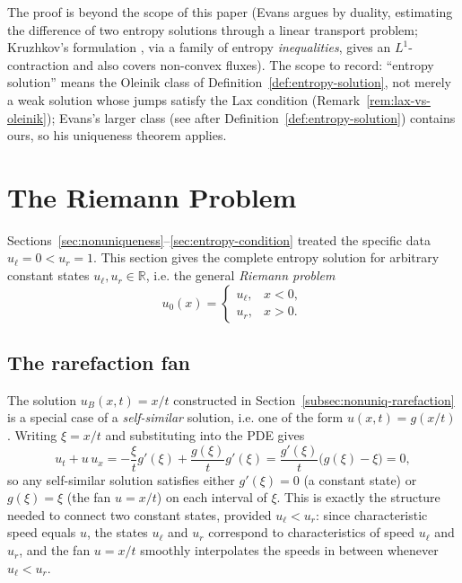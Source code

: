 \noindent The proof is beyond the scope of this paper (Evans argues by duality,
estimating the difference of two entropy solutions through a linear transport
problem; Kruzhkov's formulation \cite{kruzhkov1970}, via a family of entropy
\emph{inequalities}, gives an $L^1$-contraction and also covers non-convex
fluxes). The scope to record: ``entropy solution'' means the Oleinik class of
Definition~\ref{def:entropy-solution}, not merely a weak solution whose jumps
satisfy the Lax condition (Remark~\ref{rem:lax-vs-oleinik}); Evans's larger
class (see after Definition~\ref{def:entropy-solution}) contains ours, so his
uniqueness theorem applies.


\section{The Riemann Problem}
\label{sec:riemann-problem}

Sections~\ref{sec:nonuniqueness}--\ref{sec:entropy-condition} treated the
specific data $u_\ell=0<u_r=1$. This section gives the complete entropy
solution for arbitrary constant states $u_\ell, u_r \in \mathbb{R}$, i.e.
the general \emph{Riemann problem}
\begin{equation}
  \label{eq:general-riemann-data}
  u_0(x) = \begin{cases} u_\ell, & x<0, \\ u_r, & x>0. \end{cases}
\end{equation}

\subsection{The rarefaction fan}
\label{subsec:rarefaction-general}

The solution $u_B(x,t)=x/t$ constructed in
Section~\ref{subsec:nonuniq-rarefaction} is a special case of a
\emph{self-similar} solution, i.e. one of the form $u(x,t)=g(x/t)$.
Writing $\xi = x/t$ and substituting into the PDE gives
\begin{equation}
  u_t + u\,u_x = -\frac{\xi}{t}g'(\xi) + \frac{g(\xi)}{t}g'(\xi)
  = \frac{g'(\xi)}{t}\big(g(\xi)-\xi\big) = 0,
\end{equation}
so any self-similar solution satisfies either $g'(\xi)=0$ (a constant
state) or $g(\xi)=\xi$ (the fan $u=x/t$) on each interval of $\xi$. This
is exactly the structure needed to connect two constant states, provided
$u_\ell < u_r$: since characteristic speed equals $u$, the states
$u_\ell$ and $u_r$ correspond to characteristics of speed $u_\ell$ and
$u_r$, and the fan $u=x/t$ smoothly interpolates the speeds in between
whenever $u_\ell<u_r$.

